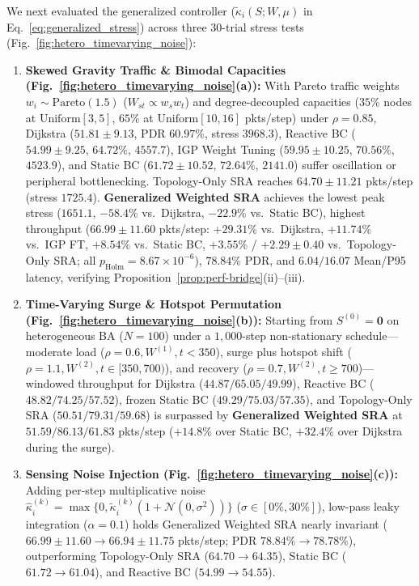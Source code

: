 \documentclass[journal]{IEEEtran}
\theoremstyle{plain}
\theoremstyle{definition}
\begin{document}
{We next evaluated the generalized controller ($\widetilde{\kappa}_i(S;W,\mu)$ in Eq.~\eqref{eq:generalized_stress}) across three 30-trial stress tests (Fig.~\ref{fig:hetero_timevarying_noise}):
\begin{enumerate}
    \item \textbf{Skewed Gravity Traffic \& Bimodal Capacities (Fig.~\ref{fig:hetero_timevarying_noise}(a)):} With Pareto traffic weights $w_i \sim \mathrm{Pareto}(1.5)$ ($W_{st} \propto w_s w_t$) and degree-decoupled capacities ($35\%$ nodes at $\mathrm{Uniform}[3, 5]$, $65\%$ at $\mathrm{Uniform}[10, 16]$ pkts/step) under $\rho=0.85$, Dijkstra ($51.81 \pm 9.13$, PDR $60.97\%$, stress $3968.3$), Reactive BC ($54.99 \pm 9.25$, $64.72\%$, $4557.7$), IGP Weight Tuning ($59.95 \pm 10.25$, $70.56\%$, $4523.9$), and Static BC ($61.72 \pm 10.52$, $72.64\%$, $2141.0$) suffer oscillation or peripheral bottlenecking. Topology-Only SRA reaches $64.70 \pm 11.21$ pkts/step (stress $1725.4$). \textbf{Generalized Weighted SRA} achieves the lowest peak stress ($\mathbf{1651.1}$, $-58.4\%$ vs.\ Dijkstra, $-22.9\%$ vs.\ Static BC), highest throughput ($\mathbf{66.99 \pm 11.60}$ pkts/step: $+29.31\%$ vs.\ Dijkstra, $+11.74\%$ vs.\ IGP FT, $+8.54\%$ vs.\ Static BC, $+3.55\%$ / $+2.29 \pm 0.40$ vs.\ Topology-Only SRA; all $p_{\text{Holm}} = 8.67 \times 10^{-6}$), $\mathbf{78.84\%}$ PDR, and $6.04/16.07$ Mean/P95 latency, verifying Proposition~\ref{prop:perf-bridge}(ii)--(iii).
    \item \textbf{Time-Varying Surge \& Hotspot Permutation (Fig.~\ref{fig:hetero_timevarying_noise}(b)):} Starting from $S^{(0)}=\mathbf{0}$ on heterogeneous BA ($N=100$) under a $1{,}000$-step non-stationary schedule—moderate load ($\rho=0.6, W^{(1)}, t<350$), surge plus hotspot shift ($\rho=1.1, W^{(2)}, t\in[350,700)$), and recovery ($\rho=0.7, W^{(2)}, t\ge 700$)—windowed throughput for Dijkstra ($44.87/65.05/49.99$), Reactive BC ($48.82/74.25/57.52$), frozen Static BC ($49.29/75.03/57.35$), and Topology-Only SRA ($50.51/79.31/59.68$) is surpassed by \textbf{Generalized Weighted SRA} at $\mathbf{51.59/86.13/61.83}$ pkts/step ($+14.8\%$ over Static BC, $+32.4\%$ over Dijkstra during the surge).
    \item \textbf{Sensing Noise Injection (Fig.~\ref{fig:hetero_timevarying_noise}(c)):} Adding per-step multiplicative noise $\hat{\kappa}_i^{(k)} = \max\{0, \widetilde{\kappa}_i^{(k)}(1 + \mathcal{N}(0, \sigma^2))\}$ ($\sigma \in [0\%, 30\%]$), low-pass leaky integration ($\alpha=0.1$) holds Generalized Weighted SRA nearly invariant ($66.99 \pm 11.60 \to \mathbf{66.94 \pm 11.75}$ pkts/step; PDR $78.84\% \to 78.78\%$), outperforming Topology-Only SRA ($64.70 \to 64.35$), Static BC ($61.72 \to 61.04$), and Reactive BC ($54.99 \to 54.55$).
\end{enumerate}}
\end{document}
